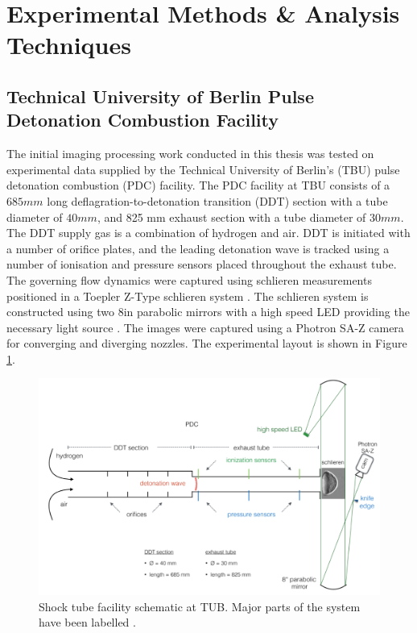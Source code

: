 \newpage
\section{Experimental Methods \& Analysis Techniques}
\subsection{Technical University of Berlin Pulse Detonation Combustion Facility}
The initial imaging processing work conducted in this thesis was tested on experimental data supplied by the Technical University of Berlin's (TBU) pulse detonation combustion (PDC) facility. The PDC facility at TBU consists of a $685mm$ long deflagration-to-detonation transition (DDT) section with a tube diameter of $40mm$, and 825 mm exhaust section with a tube diameter of $30mm$. The DDT supply gas is a combination of hydrogen and air. DDT is initiated with a number of orifice plates, and the leading detonation wave
is tracked using a number of ionisation and pressure sensors placed throughout the exhaust tube. The governing flow dynamics were captured using schlieren measurements positioned in a Toepler Z-Type schlieren system \citep{settles2001schlieren}. The schlieren system is constructed using two 8in parabolic mirrors with a high speed LED providing the necessary light source \citep{willert2012assessment}. The images were captured using a Photron SA-Z camera for converging and diverging nozzles. The experimental layout is shown in Figure \ref{fig:berlin}.

\begin{figure}[H] 
	\centering
	\includegraphics[width=1\textwidth]{berlin.PNG} 
	\caption{Shock tube facility schematic at TUB. Major parts of the
		system have been labelled \citep{bhavberlin}.}
	\label{fig:berlin}
\end{figure}
\newpage
